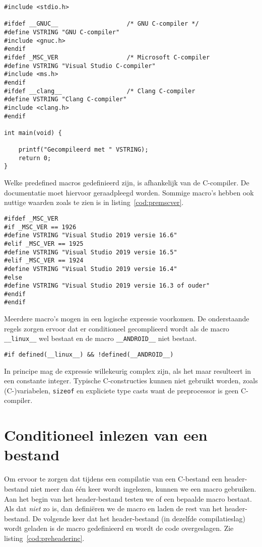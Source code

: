\begin{lstlisting}[caption=Conditioneel inlezen van header-bestanden.,label=cod:precondinc]
#include <stdio.h>

#ifdef __GNUC__                   /* GNU C-compiler */
#define VSTRING "GNU C-compiler"
#include <gnuc.h>
#endif
#ifdef _MSC_VER                   /* Microsoft C-compiler
#define VSTRING "Visual Studio C-compiler"
#include <ms.h>
#endif
#ifdef __clang__                  /* Clang C-compiler
#define VSTRING "Clang C-compiler"
#include <clang.h>
#endif

int main(void) {

	printf("Gecompileerd met " VSTRING);
	return 0;
}

\end{lstlisting}

Welke predefined macros gedefinieerd zijn, is afhankelijk van de C-compiler. De documentatie moet hiervoor geraadpleegd worden. Sommige macro's hebben ook nuttige waarden zoals te zien is in listing~\ref{cod:premscver}.

\begin{lstlisting}[caption=Gebruik van de \texttt{\_MSC\_VER}-macro.,label=cod:premscver]
#ifdef _MSC_VER
#if _MSC_VER == 1926
#define VSTRING "Visual Studio 2019 versie 16.6"
#elif _MSC_VER == 1925
#define VSTRING "Visual Studio 2019 versie 16.5"
#elif _MSC_VER == 1924
#define VSTRING "Visual Studio 2019 versie 16.4"
#else
#define VSTRING "Visual Studio 2019 versie 16.3 of ouder"
#endif
#endif
\end{lstlisting}

Meerdere macro's mogen in een logische expressie voorkomen. De onderstaande regels zorgen ervoor dat er conditioneel gecomplieerd wordt als de macro \texttt{\_\_linux\_\_} wel bestaat en de macro \texttt{\_\_ANDROID\_\_} niet bestaat.

\hspace*{1em}\texttt{\#if defined(\_\_linux\_\_) \&\& !defined(\_\_ANDROID\_\_)}

In principe mag de expressie willekeurig complex zijn, als het maar resulteert in een constante integer. Typische C-constructies kunnen niet gebruikt worden, zoals (C-)variabelen, \texttt{sizeof} en expliciete type casts want de preprocessor is geen C-compiler.


\section{Conditioneel inlezen van een bestand}
\label{sec:conditioneelinlezen}
Om ervoor te zorgen dat tijdens een compilatie van een C-bestand een header-bestand niet meer dan één keer wordt ingelezen, kunnen we een macro gebruiken. Aan het begin van het header-bestand testen we of een bepaalde macro bestaat. Als dat \textsl{niet} zo is, dan definiëren we de macro en laden de rest van het header-bestand. De volgende keer dat het header-bestand (in dezelfde compilatieslag) wordt geladen is de macro gedefinieerd en wordt de code overgeslagen. Zie listing~\ref{cod:preheaderinc}.

